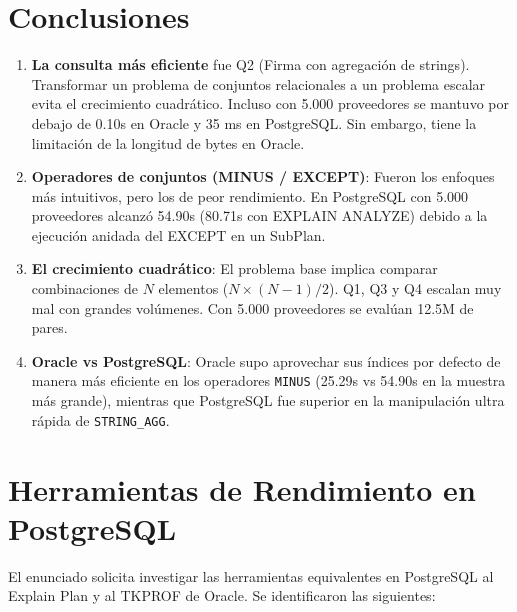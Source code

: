 \documentclass[12pt,a4paper]{article}
\begin{document}
\section{Conclusiones}
\begin{enumerate}
    \item \textbf{La consulta más eficiente} fue Q2 (Firma con agregación de strings). Transformar un problema de conjuntos relacionales a un problema escalar evita el crecimiento cuadrático. Incluso con 5.000 proveedores se mantuvo por debajo de 0.10s en Oracle y 35 ms en PostgreSQL. Sin embargo, tiene la limitación de la longitud de bytes en Oracle.
    \item \textbf{Operadores de conjuntos (MINUS / EXCEPT)}: Fueron los enfoques más intuitivos, pero los de peor rendimiento. En PostgreSQL con 5.000 proveedores alcanzó 54.90s (80.71s con EXPLAIN ANALYZE) debido a la ejecución anidada del EXCEPT en un SubPlan.
    \item \textbf{El crecimiento cuadrático}: El problema base implica comparar combinaciones de $N$ elementos ($N \times (N-1) / 2$). Q1, Q3 y Q4 escalan muy mal con grandes volúmenes. Con 5.000 proveedores se evalúan 12.5M de pares.
    \item \textbf{Oracle vs PostgreSQL}: Oracle supo aprovechar sus índices por defecto de manera más eficiente en los operadores \texttt{MINUS} (25.29s vs 54.90s en la muestra más grande), mientras que PostgreSQL fue superior en la manipulación ultra rápida de \texttt{STRING\_AGG}.
\end{enumerate}

\section{Herramientas de Rendimiento en PostgreSQL}
El enunciado solicita investigar las herramientas equivalentes en PostgreSQL al Explain Plan y al TKPROF de Oracle. Se identificaron las siguientes:
\end{document}

